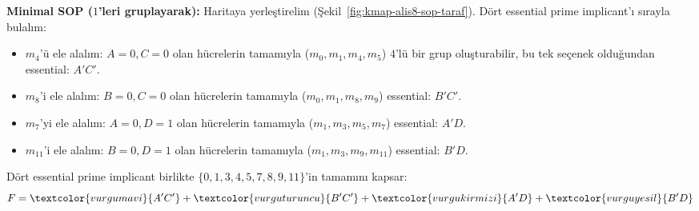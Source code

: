 \textbf{Minimal SOP ($1$'leri gruplayarak):} Haritaya yerleştirelim
(Şekil~\ref{fig:kmap-alis8-sop-taraf}). Dört essential prime implicant'ı sırayla
bulalım:
\begin{itemize}[nosep, leftmargin=*]
    \item $m_4$'ü ele alalım: $A=0,C=0$ olan hücrelerin tamamıyla
    ($m_0,m_1,m_4,m_5$) $4$'lü bir grup oluşturabilir, bu tek seçenek olduğundan
    essential: $A'C'$.
    \item $m_8$'i ele alalım: $B=0,C=0$ olan hücrelerin tamamıyla
    ($m_0,m_1,m_8,m_9$) essential: $B'C'$.
    \item $m_7$'yi ele alalım: $A=0,D=1$ olan hücrelerin tamamıyla
    ($m_1,m_3,m_5,m_7$) essential: $A'D$.
    \item $m_{11}$'i ele alalım: $B=0,D=1$ olan hücrelerin tamamıyla
    ($m_1,m_3,m_9,m_{11}$) essential: $B'D$.
\end{itemize}
Dört essential prime implicant birlikte $\{0,1,3,4,5,7,8,9,11\}$'in tamamını kapsar:
\[
F = \textcolor{vurgumavi}{A'C'} + \textcolor{vurguturuncu}{B'C'} + \textcolor{vurgukirmizi}{A'D} + \textcolor{vurguyesil}{B'D}
\]

